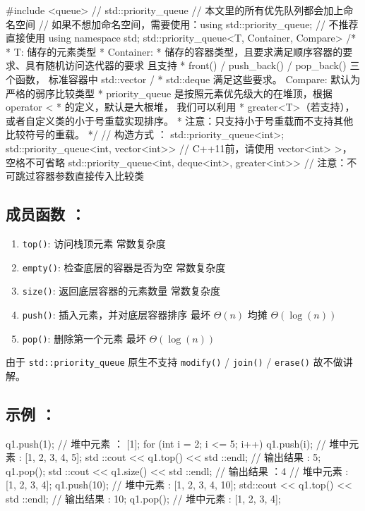 
\begin{cppcode}
#include <queue>  // std::priority_queue
// 本文里的所有优先队列都会加上命名空间
// 如果不想加命名空间，需要使用：using std::priority_queue;
// 不推荐直接使用 using namespace std;
std::priority_queue<T, Container, Compare>
    /*
     * T: 储存的元素类型
     * Container:
     * 储存的容器类型，且要求满足顺序容器的要求、具有随机访问迭代器的要求 且支持
     * front() / push_back() / pop_back() 三个函数， 标准容器中 std::vector /
     * std::deque 满足这些要求。 Compare: 默认为严格的弱序比较类型
     * priority_queue 是按照元素优先级大的在堆顶，根据 operator <
     * 的定义，默认是大根堆， 我们可以利用
     * greater<T>（若支持），或者自定义类的小于号重载实现排序。
     * 注意：只支持小于号重载而不支持其他比较符号的重载。
     */
    // 构造方式 ：
    std::priority_queue<int>;
std::priority_queue<int, vector<int>>
    // C++11前，请使用 vector<int> >，空格不可省略
    std::priority_queue<int, deque<int>, greater<int>>
    // 注意：不可跳过容器参数直接传入比较类
\end{cppcode}

\subsection{成员函数 ：}

\begin{enumerate}
\item \texttt{top()}: 访问栈顶元素 常数复杂度
\item \texttt{empty()}: 检查底层的容器是否为空 常数复杂度
\item \texttt{size()}: 返回底层容器的元素数量 常数复杂度
\item \texttt{push()}: 插入元素，并对底层容器排序 最坏 $\Theta(n)$ 均摊 $\Theta(\log(n))$
\item \texttt{pop()}: 删除第一个元素 最坏 $\Theta(\log(n))$
\end{enumerate}

由于 \texttt{std::priority_queue} 原生不支持 \texttt{modify()} / \texttt{join()} / \texttt{erase()} 故不做讲解。

\subsection{示例 ：}

\begin{cppcode}
q1.push(1);
// 堆中元素 ： [1];
for (int i = 2; i <= 5; i++) q1.push(i);
// 堆中元素 :  [1, 2, 3, 4, 5];
std ::cout << q1.top() << std ::endl;
// 输出结果 : 5;
q1.pop();
std ::cout << q1.size() << std ::endl;
// 输出结果 ：4
// 堆中元素 : [1, 2, 3, 4];
q1.push(10);
// 堆中元素 : [1, 2, 3, 4, 10];
std::cout << q1.top() << std ::endl;
// 输出结果 : 10;
q1.pop();
// 堆中元素 : [1, 2, 3, 4];
\end{cppcode}
